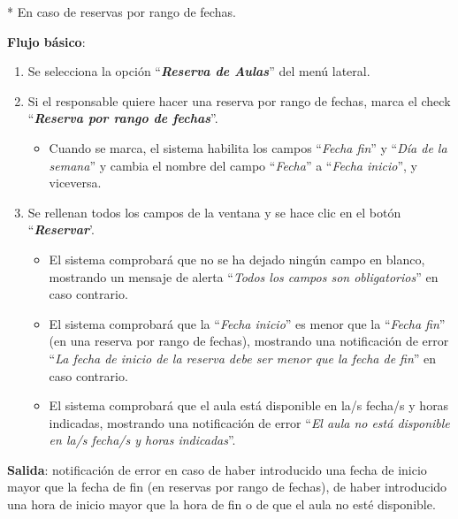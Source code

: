 * En caso de reservas por rango de fechas.

\textbf{Flujo básico}:
    \begin{enumerate}
        \item Se selecciona la opción ``\textbf{\textit{Reserva de Aulas}}'' del menú lateral.
        
        \item Si el responsable quiere hacer una reserva por rango de fechas, marca el check ``\textbf{\textit{Reserva por rango de fechas}}''.
            \begin{itemize}
                \item Cuando se marca, el sistema habilita los campos ``\textit{Fecha fin}'' y ``\textit{Día de la semana}'' y cambia el nombre del campo ``\textit{Fecha}'' a ``\textit{Fecha inicio}'', y viceversa.
            \end{itemize}
            
        \item Se rellenan todos los campos de la ventana y se hace clic en el botón ``\textbf{\textit{Reservar}}'.
            \begin{itemize}
            \tightlist
                \item El sistema comprobará que no se ha dejado ningún campo en blanco, mostrando un mensaje de alerta ``\textit{Todos los campos son obligatorios}'' en caso contrario.
                
                \item El sistema comprobará que la ``\textit{Fecha inicio}'' es menor que la ``\textit{Fecha fin}'' (en una reserva por rango de fechas), mostrando una notificación de error ``\textit{La fecha de inicio de la reserva debe ser menor que la fecha de fin}'' en caso contrario.
                
                \item El sistema comprobará que el aula está disponible en la/s fecha/s y horas indicadas, mostrando una notificación de error ``\textit{El aula no está disponible en la/s fecha/s y horas indicadas}''. 
            \end{itemize}
    \end{enumerate}

\textbf{Salida}: notificación de error en caso de haber introducido una fecha de inicio mayor que la fecha de fin (en reservas por rango de fechas), de haber introducido una hora de inicio mayor que la hora de fin o de que el aula no esté disponible.

